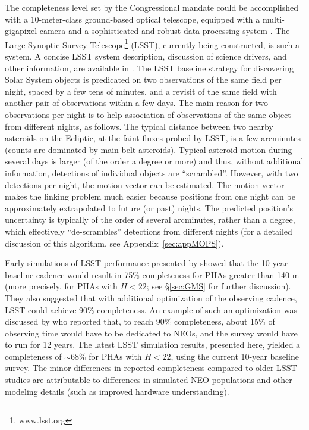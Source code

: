 The completeness level set by the Congressional mandate could be accomplished with a 10-meter-class
ground-based optical telescope, equipped with a multi-gigapixel camera and a sophisticated and robust data
processing system \citep[see NASA-commissioned reports by ][]{stokes03,shapiro10}. The Large Synoptic Survey Telescope\footnote{www.lsst.org} (LSST), currently being
constructed, is such a system. A concise LSST system description, discussion of science drivers, and other
information, are available in \cite{LSSToverview}. The LSST baseline strategy for discovering Solar System
objects is predicated on two observations of the same field per night, spaced by a few tens of minutes, and
a revisit of the same field with another pair of observations within a few days. The main reason for two
observations per night is to help association of observations of the same object from different nights,
as follows. The typical distance between two nearby asteroids on the Ecliptic, at the faint fluxes probed by
LSST, is a few arcminutes (counts are dominated by main-belt asteroids). Typical asteroid motion
during several days is larger (of the order a degree or more) and thus, without additional information,
detections of individual objects are ``scrambled''. However, with two detections per night, the motion
vector can be estimated. The motion vector makes the linking problem much easier because
positions from one night can be approximately extrapolated to future (or past) nights. The predicted
position's uncertainty is typically of the order of several arcminutes, rather than a degree, which effectively
``de-scrambles'' detections from different nights (for a detailed discussion of this algorithm, see
Appendix~\ref{sec:appMOPS}).

Early simulations of LSST performance presented by \cite{IvezicNEO2007} showed that the 10-year baseline
cadence would result in 75\% completeness for PHAs greater than 140 m (more  precisely, for PHAs with
$H<22$; see \S\ref{sec:GMS} for further discussion). They also suggested that with additional optimization of the
observing cadence, LSST could achieve 90\% completeness. An example of such an optimization was discussed
by \cite{LSSToverview} who reported that, to reach 90\% completeness, about 15\% of observing time would
have to be dedicated to NEOs, and the survey would have to run for 12 years.
The latest LSST simulation results, presented here, yielded a completeness of $\sim$68\% for
PHAs with $H<22$, using the current 10-year baseline survey. The minor differences in reported completeness
compared to older LSST studies are attributable to differences in simulated NEO populations and other modeling
details (such as improved hardware understanding).

